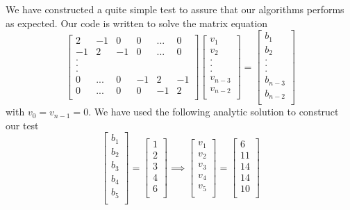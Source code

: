 \documentclass[reprint, english,notitlepage]{revtex4-1}  %
\begin{document}
We have constructed a quite simple test to assure that our algorithms performs as expected. Our code is written to solve the matrix equation
\begin{equation*}{}
  \begin{bmatrix}
2  & -1 & 0  & 0 & ... & 0 \\
-1 & 2  & -1 & 0 & ... & 0 \\
.  &    &    &   &     & \\
.  &    &    &   &     & \\
.  &    &    &   &     & \\
0  & ...& 0  &-1 & 2   & -1  \\
0  & ...& 0  & 0 &-1 & 2  \\
\end{bmatrix}
  \begin{bmatrix}
 v_1  \\
 v_2  \\
.   \\
.   \\
.   \\
 v_{n-3} \\
v_{n-2} \\
\end{bmatrix}
=
\begin{bmatrix}
b_1 \\
b_2 \\
.   \\
.   \\
.   \\
b_{n-3} \\
b_{n-2} \\
\end{bmatrix}
\end{equation*}
with $v_0 = v_{n-1} = 0$. We have used the following analytic solution to construct our test
\begin{equation*}
\begin{bmatrix}
b_1 \\
b_2 \\
b_3 \\
b_4 \\
b_5 \\
\end{bmatrix}
 =
 \begin{bmatrix}
 1 \\
 2 \\
 3   \\
 4   \\
 6   \\
 \end{bmatrix}
 \implies
 \begin{bmatrix}
 v_1 \\
 v_2 \\
 v_3 \\
 v_4 \\
 v_5 \\
 \end{bmatrix}
  =
  \begin{bmatrix}
  6 \\
  11 \\
  14  \\
  14  \\
  10  \\
  \end{bmatrix}
\end{equation*}
\end{document}

